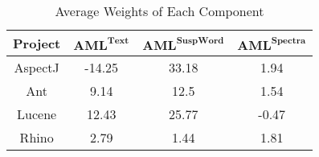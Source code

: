 %

\begin{table}[!htb]
	\caption{Average Weights of Each Component }
	\centering
    \begin{tabular}{|c|c|c|c|}
    \hline
    \textbf{Project} & $\textbf{AML}^\textbf{Text}$ & $\textbf{AML}^{\textbf{SuspWord}}$ & $\textbf{AML}^\textbf{Spectra}$ \\ \hline\hline
AspectJ&-14.25&33.18&1.94\\\hline
Ant&9.14&12.5&1.54\\\hline
Lucene&12.43&25.77&-0.47\\\hline
Rhino&2.79&1.44&1.81\\\hline
    \end{tabular}
    \label{tab:contributions}
\end{table}



